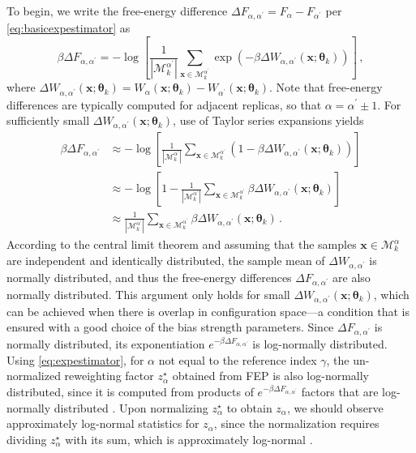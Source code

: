 \documentclass{article}
\numberwithin{equation}{section}
\def\*#1{\mathbf{#1}}
\theoremstyle{definition}
\theoremstyle{remark}
\def\thetab{\boldsymbol{\theta}}
\begin{document}
To begin, we write the free-energy difference $\Delta F_{\alpha, \alpha^\prime}=F_\alpha-F_{\alpha^\prime}$ per \cref{eq:basicexpestimator} as
\begin{equation}
    \beta \Delta F_{\alpha, \alpha^\prime} = -\log \left [ \frac{1}{|\mathcal{M}_k^{\alpha^\prime}|}  \sum_{\* x \in \mathcal{M}^{\alpha^\prime}_k} \exp ( - \beta \Delta W_{\alpha, \alpha^\prime}(\* x; \thetab_k ) ) \right] \,, \label{eq:flylossconcise}
\end{equation} 
where $ \Delta W_{\alpha, \alpha^\prime}(\* x; \thetab_k )=W_\alpha ( \* x ; \thetab_k )-W_{\alpha^\prime}(\* x; \thetab_k ) $. Note that free-energy differences are typically computed for adjacent replicas, so that $ \alpha = \alpha^\prime \pm 1 $. For sufficiently small $ \Delta W_{\alpha, \alpha^\prime}(\* x ; \thetab_k ) $, use of Taylor series expansions yields
\begin{align}
    \beta \Delta F_{\alpha, \alpha^\prime} &\approx -\log \left [ \frac{1}{|\mathcal{M}_k^{\alpha^\prime}|}  \sum_{\* x \in \mathcal{M}^{\alpha^\prime}_k} \left( 1  - \beta \Delta W_{\alpha, \alpha^\prime}(\* x ; \thetab_k ) \right) \right] \\
                                          &\approx -\log \left [ 1 - \frac{1}{|\mathcal{M}_k^{\alpha^\prime}|} \sum_{\* x \in \mathcal{M}^{\alpha^\prime}_k} \beta \Delta W_{\alpha, \alpha^\prime}(\* x ; \thetab_k ) \right] \\
                                          &\approx \frac{1}{|\mathcal{M}_k^{\alpha^\prime}|} \sum_{\* x \in \mathcal{M}^{\alpha^\prime}_k} \beta \Delta W_{\alpha, \alpha^\prime}(\* x ; \thetab_k ) \,.
\end{align}
According to the central limit theorem and assuming that the samples $ \* x  \in \mathcal{M}^{\alpha}_k $ are independent and identically distributed, the sample mean of $ \Delta W_{\alpha, \alpha^\prime} $ is normally distributed, and thus the free-energy differences $\Delta F_{\alpha, \alpha^\prime}$ are also normally distributed.
This argument only holds for small $ \Delta W_{\alpha, \alpha^\prime}(\* x ; \thetab_k) $, which can be achieved when there is overlap in configuration space---a condition that is ensured with a good choice of the bias strength parameters. Since $ \Delta F_{\alpha, \alpha^\prime} $ is normally distributed, its exponentiation $ e^{-\beta \Delta F_{\alpha, \alpha^\prime}} $ is log-normally distributed.
Using \cref{eq:expestimator}, for $ \alpha $ not equal to the reference index $ \gamma $, the un-normalized reweighting factor $ z_\alpha^\star $ obtained from FEP is also log-normally distributed, since it is computed from products of $ e^{-\beta \Delta F_{\alpha, \alpha^\prime}} $  factors that are log-normally distributed 
\cite{forbes2011statistical}.
Upon normalizing $ z_\alpha^\star $ to obtain $ z_\alpha $, we should observe approximately log-normal statistics for $ z_\alpha $, since the normalization requires dividing $ z_\alpha^\star $ with its sum, which is approximately log-normal \cite{marlow1967,barouch1986sums,beaulieu1996,mehta2007,asmussen2008}.
\end{document}
